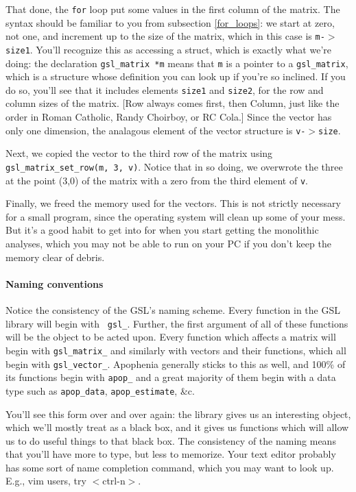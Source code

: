 That done, the {\tt for} loop put some values in the first column of the matrix. 
The syntax should be familiar to you from subsection \ref{for_loops}: we start at
zero, not one, and increment up to the size of the matrix, which in this case is
{\tt m-$>$size1}. You'll recognize this as accessing a struct, which is exactly
what we're doing: the declaration {\tt gsl\_matrix *m} means that {\tt m} is a
pointer to a {\tt gsl\_matrix}, which is a structure whose definition you can
look up if you're so inclined. If you do so, you'll see that it includes 
elements {\tt size1} and {\tt size2}, for the row and column sizes of the
matrix. [Row always comes first, then Column, just like the order in Roman Catholic, 
Randy Choirboy, or RC Cola.] Since the vector has only one dimension, the analagous element
of the vector structure is {\tt v-$>$size}.

Next, we copied the vector to the third row of the matrix using {\tt
gsl\-\_matrix\-\_set\-\_row(m, 3, v)}. Notice that in so doing, we
overwrote the three at the point (3,0) of the matrix with a zero from
the third element of {\tt v}.

Finally, we freed the memory used for the vectors. This is not strictly
necessary for a small program, since the operating system
will clean up some of your mess. But it's a good habit to get into for
when you start getting the monolithic analyses, which you may not be
able to run on your PC if you don't keep the memory clear of debris.

\paragraph{Naming conventions}
Notice the consistency of
the GSL's naming scheme. Every function in the GSL library will begin with {\tt
gsl\_}. 
Further, the first argument of all of these functions will be the object to be acted upon.
Every function which affects a matrix will begin with {\tt gsl\_matrix\_}
and similarly with vectors and their functions, which all begin with {\tt gsl\_vector\_}. 
Apophenia generally sticks to this as well, and 100\% of its functions
begin with {\tt apop\_} and a great majority of them begin with a data
type such as {\tt apop\_data}, {\tt apop\_estimate}, \&c.

You'll see this form over and over again: the library gives us an interesting
object, which we'll mostly treat as a black box, and it gives us functions which
will allow us to do useful things to that black box. The consistency of the
naming means that you'll have more to type, but less to memorize. Your text
editor probably has some sort of name completion command, which you may want to
look up. E.g., vim users, try $<$ctrl-n$>$.


